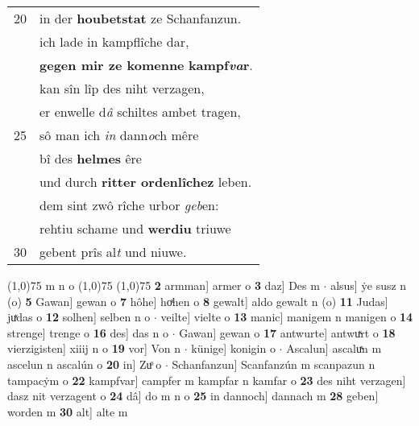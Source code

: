 \documentclass[8pt,a4paper,notitlepage]{article}
\begin{document}
\begin{table}[ht]
\begin{minipage}[t]{0.5\linewidth}
\begin{tabular}{rl}
20 & in der \textbf{houbetstat} ze Schanfanzun.\\ 
 & ich lade in kampflîche dar,\\ 
 & \textbf{gegen mir ze komenne} \textbf{kampf\textit{va}r}.\\ 
 & kan sîn lîp des niht verzagen,\\ 
 & er enwelle d\textit{â} schiltes ambet tragen,\\ 
25 & sô man ich \textit{in} dann\textit{o}ch mêre\\ 
 & bî des \textbf{helmes} êre\\ 
 & und durch \textbf{ritter ordenlîchez} leben.\\ 
 & dem sint zwô rîche urbor \textit{geb}en:\\ 
 & rehtiu schame und \textbf{werdiu} triuwe\\ 
30 & gebent prîs al\textit{t} und niuwe.\\ 
\end{tabular}
\scriptsize
\line(1,0){75} \newline
m n o \newline
\line(1,0){75} \newline
\newline
\line(1,0){75} \newline
\textbf{2} armman] armer o \textbf{3} daz] Des m  $\cdot$ alsus] ẏe susz n (o) \textbf{5} Gawan] gewan o \textbf{7} hôhe] hoͯhen o \textbf{8} gewalt] aldo gewalt n (o) \textbf{11} Judas] juͯdas o \textbf{12} solhen] selben n o  $\cdot$ veilte] vielte o \textbf{13} manic] manigem n manigen o \textbf{14} strenge] trenge o \textbf{16} des] das n o  $\cdot$ Gawan] gewan o \textbf{17} antwurte] antwuͯrt o \textbf{18} vierzigisten] xiiij n o \textbf{19} vor] Von n  $\cdot$ künige] konigin o  $\cdot$ Ascalun] ascaluͯn m ascelun n ascalún o \textbf{20} in] Zuͦ o  $\cdot$ Schanfanzun] Scanfanzún m scanpazun n tampacẏm o \textbf{22} kampfvar] campfer m kampfar n kamfar o \textbf{23} des niht verzagen] dasz nit verzagent o \textbf{24} dâ] do m n o \textbf{25} in dannoch] dannach m \textbf{28} geben] worden m \textbf{30} alt] alte m \newline
\end{minipage}
\end{table}
\newpage
\end{document}

